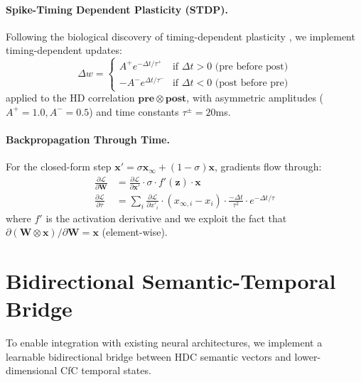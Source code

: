 \documentclass{article}
\newcommand{\bind}{\otimes}
\newcommand{\hvx}{\mathbf{x}}
\newcommand{\hvw}{\mathbf{W}}
\newcommand{\xinf}{\mathbf{x}_\infty}
\begin{document}
\paragraph{Spike-Timing Dependent Plasticity (STDP).} Following the biological discovery of timing-dependent plasticity \cite{bi1998synaptic}, we implement timing-dependent updates:
\begin{equation}
    \Delta w = \begin{cases}
        A^+ e^{-\Delta t / \tau^+} & \text{if } \Delta t > 0 \text{ (pre before post)} \\
        -A^- e^{\Delta t / \tau^-} & \text{if } \Delta t < 0 \text{ (post before pre)}
    \end{cases}
\end{equation}
applied to the HD correlation $\mathbf{pre} \bind \mathbf{post}$, with asymmetric amplitudes ($A^+ = 1.0, A^- = 0.5$) and time constants $\tau^\pm = 20$ms.

\paragraph{Backpropagation Through Time.} For the closed-form step $\hvx' = \sigma \xinf + (1{-}\sigma)\hvx$, gradients flow through:
\begin{align}
    \frac{\partial \mathcal{L}}{\partial \hvw} &= \frac{\partial \mathcal{L}}{\partial \hvx'} \cdot \sigma \cdot f'(\mathbf{z}) \cdot \hvx \label{eq:bptt_w} \\
    \frac{\partial \mathcal{L}}{\partial \tau} &= \sum_i \frac{\partial \mathcal{L}}{\partial x'_i} \cdot (x_{\infty,i} - x_i) \cdot \frac{-\Delta t}{\tau^2} \cdot e^{-\Delta t/\tau} \label{eq:bptt_tau}
\end{align}
where $f'$ is the activation derivative and we exploit the fact that $\partial(\hvw \bind \hvx)/\partial \hvw = \hvx$ (element-wise).

\section{Bidirectional Semantic-Temporal Bridge}
\label{sec:bridge}

To enable integration with existing neural architectures, we implement a learnable bidirectional bridge between HDC semantic vectors and lower-dimensional CfC temporal states.
\end{document}
